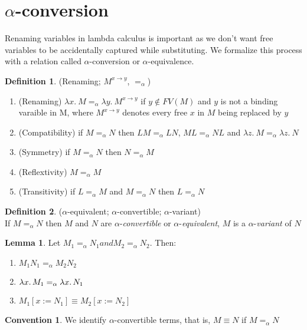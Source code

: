 \documentclass[a4paper]{book}
\theoremstyle{definition}
\newtheorem{definition}{Definition}[section]
\newtheorem{lemma}{Lemma}[section]
\newtheorem{conv}{Convention}[section]
\begin{document}
\section{$\alpha$-conversion}
Renaming variables in lambda calculus is important as we don't want free variables to be accidentally captured
while substituting. We formalize this process with a relation called $\alpha$-conversion or $\alpha$-equivalence.
\begin{definition}
  (Renaming; $M^{x \rightarrow y}$, $=_\alpha$)\\
  \begin{enumerate}
    \item (Renaming) $\lambda x.\ M =_\alpha \lambda y.\ M^{x \rightarrow y}$ if $y \notin FV(M)$ and $y$ is not a binding varaible in M, where $M^{x \rightarrow y}$
          denotes every free $x$ in $M$ being replaced by $y$
    \item (Compatibility) if \(M =_\alpha N\) then \(L M =_\alpha L N\), \(M L =_\alpha N L\) and \(\lambda z.\ M =_\alpha \lambda z.\ N\)
    \item (Symmetry) if \(M =_\alpha N\) then \(N =_\alpha M\)
    \item (Reflextivity) \(M =_\alpha M\)
    \item (Transitivity) if \(L =_\alpha M\) and \(M =_\alpha N\) then \(L =_\alpha N\)
  \end{enumerate}
\end{definition}
\begin{definition}
  (\(\alpha\)-equivalent; \(\alpha\)-convertible; \(\alpha\)-variant)\\
  If \(M =_\alpha N\) then \(M\) and \(N\) are \(\alpha\)-\textit{convertible} or \(\alpha\)-\textit{equivalent}, \(M\) is a \(\alpha\)-\textit{variant} of \(N\)
\end{definition}
\begin{lemma}
  Let \(M_1 =_\alpha N_1 and M_2 =_\alpha N_2\). Then:
  \begin{enumerate}
    \item \(M_1 N_1 =_\alpha M_2 N_2\)
    \item \(\lambda x\ldotp M_1 =_\alpha \lambda x\ldotp N_1\)
    \item \(M_1[x := N_1] \equiv M_2[x := N_2]\)
  \end{enumerate}
\end{lemma}
\begin{conv}
  We identify \(\alpha\)-convertible terms, that is, \(M \equiv N\) if \(M =_\alpha N\)
\end{conv}
\end{document}
